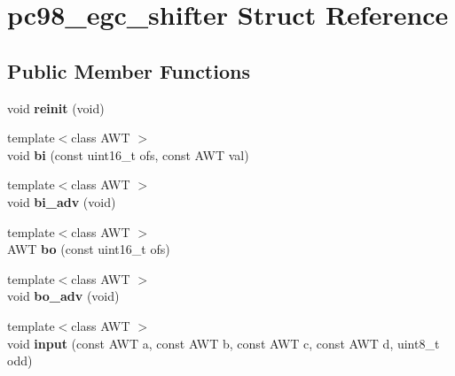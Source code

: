 \hypertarget{structpc98__egc__shifter}{\section{pc98\-\_\-egc\-\_\-shifter Struct Reference}
\label{structpc98__egc__shifter}
}
\subsection*{Public Member Functions}
\begin{DoxyCompactItemize}
\item 
\hypertarget{structpc98__egc__shifter_a821d8576bb5d2d28ac9694aaac4f8e6d}{void {\bfseries reinit} (void)}\label{structpc98__egc__shifter_a821d8576bb5d2d28ac9694aaac4f8e6d}

\item 
\hypertarget{structpc98__egc__shifter_a0bfb40dd8fc0ea6f3e906706fb3758f5}{{\footnotesize template$<$class A\-W\-T $>$ }\\void {\bfseries bi} (const uint16\-\_\-t ofs, const A\-W\-T val)}\label{structpc98__egc__shifter_a0bfb40dd8fc0ea6f3e906706fb3758f5}

\item 
\hypertarget{structpc98__egc__shifter_a19e46dc37dd6c9ebd635cc16abd25ace}{{\footnotesize template$<$class A\-W\-T $>$ }\\void {\bfseries bi\-\_\-adv} (void)}\label{structpc98__egc__shifter_a19e46dc37dd6c9ebd635cc16abd25ace}

\item 
\hypertarget{structpc98__egc__shifter_a59e687c965915258b8ef15388207295a}{{\footnotesize template$<$class A\-W\-T $>$ }\\A\-W\-T {\bfseries bo} (const uint16\-\_\-t ofs)}\label{structpc98__egc__shifter_a59e687c965915258b8ef15388207295a}

\item 
\hypertarget{structpc98__egc__shifter_a3566495d2e7d09e82a181487dc668a02}{{\footnotesize template$<$class A\-W\-T $>$ }\\void {\bfseries bo\-\_\-adv} (void)}\label{structpc98__egc__shifter_a3566495d2e7d09e82a181487dc668a02}

\item 
\hypertarget{structpc98__egc__shifter_a772c342a70772797895d5ee88db8ed45}{{\footnotesize template$<$class A\-W\-T $>$ }\\void {\bfseries input} (const A\-W\-T a, const A\-W\-T b, const A\-W\-T c, const A\-W\-T d, uint8\-\_\-t odd)}\label{structpc98__egc__shifter_a772c342a70772797895d5ee88db8ed45}


\end{DoxyCompactItemize}
